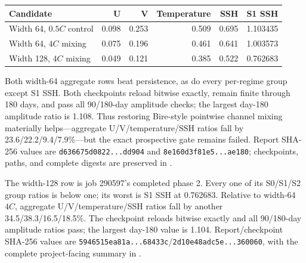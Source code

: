 \documentclass[11pt]{article}
\begin{document}
\begin{center}
\small
\begin{tabular}{@{}lrrrrr@{}}
\toprule
\textbf{Candidate} & \textbf{U} & \textbf{V} & \textbf{Temperature} &
\textbf{SSH} & \textbf{S1 SSH} \\
\midrule
Width 64, \(0.5C\) control & 0.098 & 0.253 & 0.509 & 0.695 & 1.103435 \\
Width 64, \(4C\) mixing & 0.075 & 0.196 & 0.461 & 0.641 & 1.003573 \\
Width 128, \(4C\) mixing & 0.049 & 0.121 & 0.385 & 0.522 & 0.762683 \\
\bottomrule
\end{tabular}
\end{center}

Both width-64 aggregate rows beat persistence, as do every per-regime group except
S1 SSH.  Both checkpoints reload bitwise exactly, remain finite through 180 days, and pass all
90/180-day amplitude checks; the largest day-180 amplitude ratio is 1.108.  Thus
restoring Bire-style pointwise channel mixing materially helps---aggregate
U/V/temperature/SSH ratios fall by 23.6/22.2/9.4/7.9\%---but the exact prospective
gate remains failed.  Report SHA-256 values are
\texttt{d636675d0822...dd904} and \texttt{8e160d3f81e5...ae180}; checkpoints,
paths, and complete digests are preserved in
.

The width-128 row is job 290597's completed phase 2.  Every one of its S0/S1/S2 group
ratios is below one; its worst is S1 SSH at 0.762683.  Relative to width-64 \(4C\),
aggregate U/V/temperature/SSH ratios fall by another 34.5/38.3/16.5/18.5\%.
The checkpoint reloads bitwise exactly and all 90/180-day amplitude ratios pass; the
largest day-180 value is 1.104.  Report/checkpoint SHA-256 values are
\texttt{5946515ea81a...68433c}/\texttt{2d10e48adc5e...360060}, with the complete
project-facing summary in
.
\end{document}
